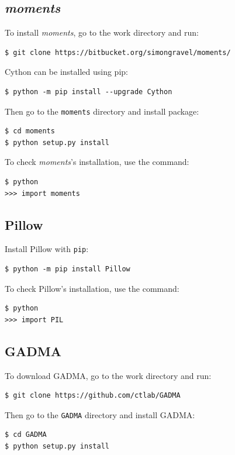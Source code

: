 \documentclass[12pt]{article}
\makeatletter
\newcommand{\moments}{\textit{moments}\xspace}
\newcommand{\py}[1]{\lstinline[language=Python, showstringspaces=False]@#1@}
\makeatother
\begin{document}
\subsection{\moments}

To install \moments, go to the work directory and run:

\begin{lstlisting}
$ git clone https://bitbucket.org/simongravel/moments/
\end{lstlisting}

Cython can be installed using pip:
\begin{lstlisting}
$ python -m pip install --upgrade Cython
\end{lstlisting}

Then go to the \py{moments} directory and install package:

\begin{lstlisting}
$ cd moments
$ python setup.py install
\end{lstlisting}

To check \moments's installation, use the command:

\begin{lstlisting}
$ python
>>> import moments
\end{lstlisting}

\subsection{Pillow}

Install Pillow with \py{pip}:

\begin{lstlisting}
$ python -m pip install Pillow
\end{lstlisting}

To check Pillow's installation, use the command:

\begin{lstlisting}
$ python
>>> import PIL
\end{lstlisting}

\subsection{GADMA}
To download GADMA, go to the work directory and run:

\begin{lstlisting}
$ git clone https://github.com/ctlab/GADMA
\end{lstlisting}

Then go to the \py{GADMA} directory and install GADMA:
\begin{lstlisting}
$ cd GADMA
$ python setup.py install
\end{lstlisting}
\end{document}
